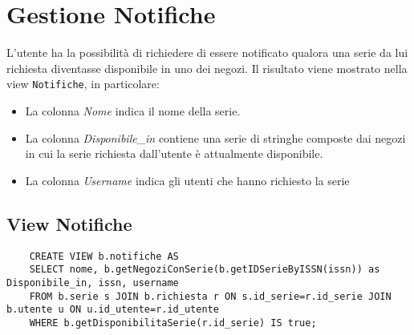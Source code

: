 \section{Gestione Notifiche}
L'utente ha la possibilità di richiedere di essere notificato qualora una serie da lui richiesta
diventasse disponibile in uno dei negozi. Il risultato viene mostrato nella view \texttt{Notifiche},
in particolare:
\begin{itemize}
    \item La colonna \textit{Nome} indica il nome della serie. 
    \item La colonna \textit{Disponibile\_in} contiene una serie di stringhe composte dai negozi in cui la serie richiesta
    dall'utente è attualmente disponibile.
    \item La colonna \textit{Username} indica gli utenti che hanno richiesto la serie
\end{itemize}

\subsection{View Notifiche}
\begin{lstlisting}
    CREATE VIEW b.notifiche AS
    SELECT nome, b.getNegoziConSerie(b.getIDSerieByISSN(issn)) as Disponibile_in, issn, username
    FROM b.serie s JOIN b.richiesta r ON s.id_serie=r.id_serie JOIN b.utente u ON u.id_utente=r.id_utente
    WHERE b.getDisponibilitaSerie(r.id_serie) IS true;
\end{lstlisting}